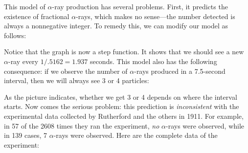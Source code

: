 This model of $\alpha$-ray production has several problems. First, it
predicts the existence of fractional $\alpha$-rays, which makes no
sense---the number detected is always a nonnegative integer. To remedy
this, we can modify our model as follows:





\noindent Notice that the graph is now a step function.  It shows that we should see a new $\alpha$-ray every $1/.5162 = 1.937$ seconds. This model also has the following consequence: if we observe the number of $\alpha$-rays produced in a 7.5-second interval, then we will always see 3 or 4 particles:




As the picture indicates, whether we get 3 or 4 depends on where the
interval starts.  Now comes the serious problem: this prediction is
{\em inconsistent\/} with the experimental data collected by
Rutherford and the others in 1911.  For example,
in 57 of the 2608 times they ran the experiment, {\em no\/}
$\alpha$-rays were observed, while in 139 cases, 7 $\alpha$-rays were
observed.  Here are the complete data of the experiment:
